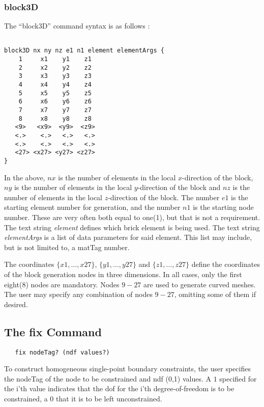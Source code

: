 \documentclass[12pt]{article}
\begin{document}
\subsubsection{block3D}
The ``block3D'' command syntax is as follows :
{\sf\small
\begin{verbatim}

block3D nx ny nz e1 n1 element elementArgs {
    1     x1    y1    z1 
    2     x2    y2    z2 
    3     x3    y3    z3 
    4     x4    y4    z4 
    5     x5    y5    z5 
    6     x6    y6    z6 
    7     x7    y7    z7 
    8     x8    y8    z8 
   <9>   <x9>  <y9>  <z9>   
   <.>    <.>   <.>   <.>
   <.>    <.>   <.>   <.>
   <27> <x27> <y27> <z27>
}
\end{verbatim}

}
In the above, $nx$ is the number of elements in the local $x$-direction of
the block,
$ny$ is the number of elements in the local $y$-direction of
the block and
$nz$ is the number of elements in the local $z$-direction of
the block.
The number $e1$ is the starting element number for generation, and 
the number $n1$ is the starting node number.  These are very often both equal to 
one(1), but that is not a requirement.  The text string {\em element} defines 
which brick element is being used.  The text string {\em elementArgs}
is a list of data parameters for said element.  This list may include, but is
not limited to, a matTag number.

The coordinates $\{x1,...,x27\}$, $\{y1,...,y27\}$ and $\{z1,...,z27\}$
define the coordinates
of the block generation nodes in three dimensions.  
In all cases, only the first eight(8) 
nodes are mandatory. Nodes $9-27$ are used to generate curved meshes.
The user may specify any combination of nodes $9-27$, omitting some of them
if desired.




\subsection{The fix Command}
{\sf\small
\begin{verbatim}
   fix nodeTag? (ndf values?)
\end{verbatim}
}

To construct homogeneous single-point boundary constraints, the user
specifies the nodeTag of the node to be constrained and ndf (0,1)
values. A $1$ specified for the i'th value indicates that the dof for
the i'th degree-of-freedom is to be constrained, a $0$ that it is to be
left unconstrained.
\end{document}
